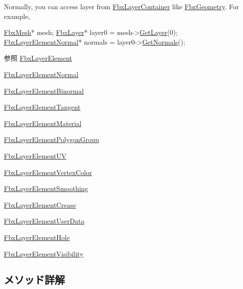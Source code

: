 Normally, you can access layer from \hyperlink{class_fbx_layer_container}{Fbx\+Layer\+Container} like \hyperlink{class_fbx_geometry}{Fbx\+Geometry}. For example, 
\begin{DoxyCode}
\hyperlink{class_fbx_mesh}{FbxMesh}* mesh;
\hyperlink{class_fbx_layer}{FbxLayer}* layer0 = mesh->\hyperlink{class_fbx_layer_container_a84f58c0498e55ff9123bba6040cccb7a}{GetLayer}(0);
\hyperlink{class_fbx_layer_element_normal}{FbxLayerElementNormal}* normals = layer0->\hyperlink{class_fbx_layer_ae29a7357ab32d3a298d85940e703b65d}{GetNormals}();
\end{DoxyCode}


\begin{DoxySeeAlso}{参照}
\hyperlink{class_fbx_layer_element}{Fbx\+Layer\+Element} 

\hyperlink{class_fbx_layer_element_normal}{Fbx\+Layer\+Element\+Normal} 

\hyperlink{class_fbx_layer_element_binormal}{Fbx\+Layer\+Element\+Binormal} 

\hyperlink{class_fbx_layer_element_tangent}{Fbx\+Layer\+Element\+Tangent} 

\hyperlink{class_fbx_layer_element_material}{Fbx\+Layer\+Element\+Material} 

\hyperlink{class_fbx_layer_element_polygon_group}{Fbx\+Layer\+Element\+Polygon\+Group} 

\hyperlink{class_fbx_layer_element_u_v}{Fbx\+Layer\+Element\+UV} 

\hyperlink{class_fbx_layer_element_vertex_color}{Fbx\+Layer\+Element\+Vertex\+Color} 

\hyperlink{class_fbx_layer_element_smoothing}{Fbx\+Layer\+Element\+Smoothing} 

\hyperlink{class_fbx_layer_element_crease}{Fbx\+Layer\+Element\+Crease} 

\hyperlink{class_fbx_layer_element_user_data}{Fbx\+Layer\+Element\+User\+Data} 

\hyperlink{class_fbx_layer_element_hole}{Fbx\+Layer\+Element\+Hole} 

\hyperlink{class_fbx_layer_element_visibility}{Fbx\+Layer\+Element\+Visibility} 
\end{DoxySeeAlso}


\subsection{メソッド詳解}
\mbox{\label{class_fbx_layer_a9922eb8a5f4cd1c6c5084f96eab5c4a8}} 
